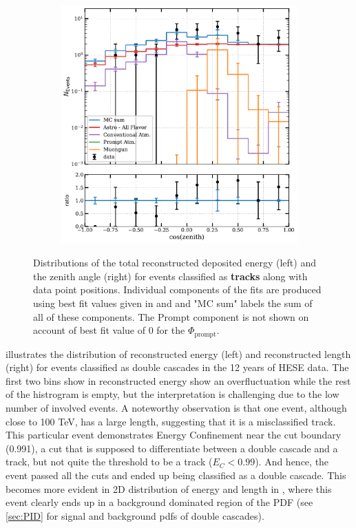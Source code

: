 \begin{figure}[h!]
\begin{subfigure}[h]{0.7\textwidth}
        \includegraphics{./figures/results/DataMC_IC86_pass2_SnowStorm_v2_Bfr_Tracks_zenith.pdf}
       
    \end{subfigure}%
    \caption{Distributions of the total reconstructed deposited energy (left) and the zenith angle (right) for events classified as \textbf{tracks} along with data point positions. Individual components of the fits are produced using best fit values given in  and  and "MC sum" labels the sum of all of these components. The Prompt component is not shown on account of best fit value of 0 for the $\Phi_{\mathrm{prompt}}$.}
\end{figure}
\newpage
{} illustrates the distribution of reconstructed energy (left) and reconstructed length (right) for events classified as double cascades in the 12 years of HESE data. The first two bins show in reconstructed energy show an overfluctuation while the rest of the histrogram is empty, but the interpretation is challenging due to the low number of involved events. A noteworthy observation is that one event, although close to 100 TeV, has a large length, suggesting that it is a misclassified track. This particular event demonstrates Energy Confinement near the cut boundary (0.991), a cut that is supposed to differentiate between a double cascade and a track, but not quite the threshold to be a track ($E_C<0.99$). And hence, the event passed all the cuts and ended up being classified as a double cascade. This becomes more evident in 2D distribution of energy and length in , where this event clearly ends up in a  background dominated region of the PDF (see \ref{sec:PID} for signal and background pdfs of double cascades). 


